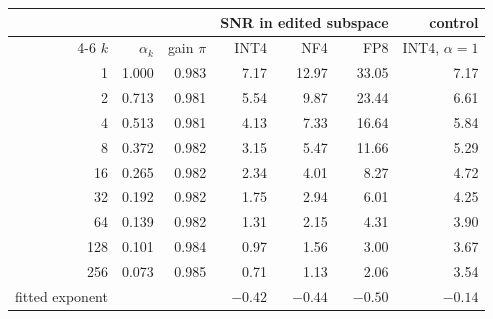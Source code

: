 \setlength{\tabcolsep}{4pt}
\begin{tabular}{@{}r r r r r r r@{}}
\toprule
& & & \multicolumn{3}{c}{SNR in edited subspace} & control \\
\cmidrule(lr){4-6}
$k$ & $\alpha_k$ & gain $\pi$ & INT4 & NF4 & FP8 & INT4, $\alpha{=}1$ \\
\midrule
1 & 1.000 & 0.983 & 7.17 & 12.97 & 33.05 & 7.17 \\
2 & 0.713 & 0.981 & 5.54 & 9.87 & 23.44 & 6.61 \\
4 & 0.513 & 0.981 & 4.13 & 7.33 & 16.64 & 5.84 \\
8 & 0.372 & 0.982 & 3.15 & 5.47 & 11.66 & 5.29 \\
16 & 0.265 & 0.982 & 2.34 & 4.01 & 8.27 & 4.72 \\
32 & 0.192 & 0.982 & 1.75 & 2.94 & 6.01 & 4.25 \\
64 & 0.139 & 0.982 & 1.31 & 2.15 & 4.31 & 3.90 \\
128 & 0.101 & 0.984 & 0.97 & 1.56 & 3.00 & 3.67 \\
256 & 0.073 & 0.985 & 0.71 & 1.13 & 2.06 & 3.54 \\
\midrule
fitted exponent & & & $-0.42$ & $-0.44$ & $-0.50$ & $-0.14$ \\
\bottomrule
\end{tabular}
